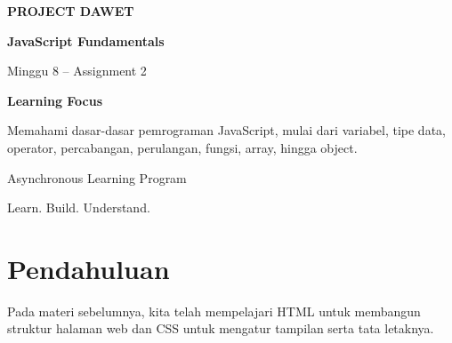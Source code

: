\documentclass[12pt,a4paper]{article}
\begin{document}
\begin{titlepage}
    \centering

    \vspace*{2cm}

    {\Large\bfseries PROJECT DAWET\par}

    \vspace{1.5cm}

    {\Huge\bfseries JavaScript Fundamentals\par}

    \vspace{0.5cm}

    {\Large Minggu 8 -- Assignment 2\par}

    \vspace{1.5cm}

    \begin{tcolorbox}[
        colback=softblue,
        colframe=dawetblue,
        width=0.85\textwidth,
        arc=2mm,
        boxrule=0.8pt
    ]
        \centering
        \textbf{Learning Focus}

        Memahami dasar-dasar pemrograman JavaScript,
        mulai dari variabel, tipe data, operator,
        percabangan, perulangan, fungsi, array,
        hingga object.
    \end{tcolorbox}

    \vfill

    {\large Asynchronous Learning Program\par}

    \vspace{0.3cm}

    {\large Learn. Build. Understand.\par}

    \vspace{1cm}
\end{titlepage}

\tableofcontents
\newpage

\section{Pendahuluan}

Pada materi sebelumnya, kita telah mempelajari HTML
untuk membangun struktur halaman web dan CSS untuk
mengatur tampilan serta tata letaknya.
\end{document}
